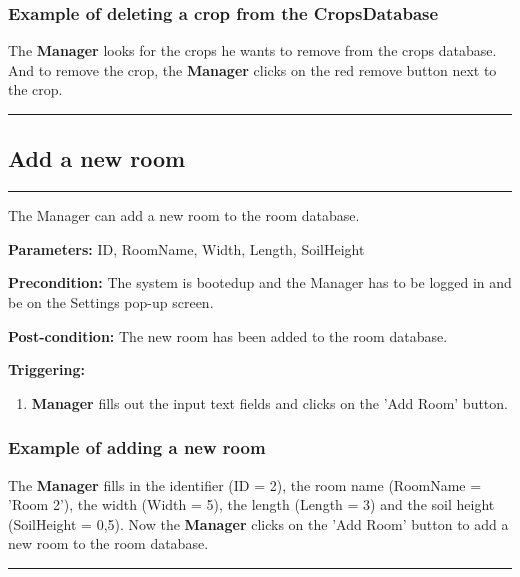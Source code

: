 \subsubsection{Example of deleting a crop from the CropsDatabase}
The \textbf{Manager} looks for the crops he wants to remove from the crops database. And to remove the crop, the \textbf{Manager} clicks on the red remove button next to the crop.
\hfill
\vspace{0.5cm}
\hrule




\subsection{Add a new room}
\hrule
\hfill
\vspace{0.5cm}
\label{operation:Add a new room}

The Manager can add a new room to the room database.

\begin{description}

\item \textbf{Parameters:} ID, RoomName, Width, Length, SoilHeight
\item \textbf{Precondition:} The system is bootedup and the Manager has to be
logged in and be on the Settings pop-up screen.
\item \textbf{Post-condition:} The new room has been added to the room database.
\item \textbf{Triggering:}
\begin{enumerate}

\item \textbf{Manager} fills out the input text fields and clicks on the 'Add Room' button.

\end{enumerate}
\end{description}

\subsubsection{Example of adding a new room}
The \textbf{Manager} fills in the identifier (ID = 2), the room name (RoomName = 'Room 2'), the width (Width = 5), the length (Length = 3) and the soil height (SoilHeight = 0,5).
Now the \textbf{Manager} clicks on the 'Add Room' button to add a new room to the room database.
\hfill
\vspace{0.5cm}
\hrule


\break


